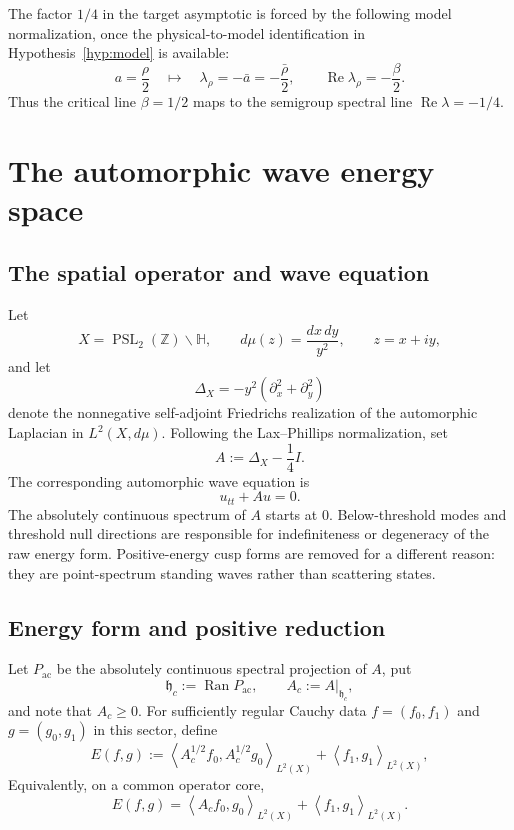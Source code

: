\documentclass[11pt]{amsart}
\theoremstyle{definition}
\theoremstyle{remark}
\DeclareMathOperator{\Ran}{Ran}
\DeclareMathOperator{\Repart}{Re}
\newcommand{\Hh}{\mathbb H}
\newcommand{\ip}[2]{\left\langle #1,#2\right\rangle}
\begin{document}
The factor $1/4$ in the target asymptotic is forced by the following
model normalization, once the physical-to-model identification in
Hypothesis~\ref{hyp:model} is available:
\[
 a=\frac{\rho}{2}
 \quad\longmapsto\quad
 \lambda_{\rho}=-\bar a=-\frac{\bar\rho}{2},
 \qquad
 \Repart\lambda_{\rho}=-\frac{\beta}{2}.
\]
Thus the critical line $\beta=1/2$ maps to the semigroup spectral line
$\Repart\lambda=-1/4$.

\section{The automorphic wave energy space}\label{sec:energy}

\subsection{The spatial operator and wave equation}

Let
\[
 X=\operatorname{PSL}_{2}(\mathbb Z)\backslash\Hh,
 \qquad
 d\mu(z)=\frac{dx\,dy}{y^{2}},\qquad z=x+iy,
\]
and let
\[
 \Delta_X=-y^{2}(\partial_x^{2}+\partial_y^{2})
\]
denote the nonnegative self-adjoint Friedrichs realization of the automorphic
Laplacian in $L^{2}(X,d\mu)$.  Following the Lax--Phillips normalization, set
\[
 A:=\Delta_X-\frac14I.
\]
The corresponding automorphic wave equation is
\begin{equation}\label{eq:wave}
 u_{tt}+Au=0.
\end{equation}
The absolutely continuous spectrum of $A$ starts at $0$.  Below-threshold
modes and threshold null directions are responsible for indefiniteness or
degeneracy of the raw energy form.  Positive-energy cusp forms are removed for
a different reason: they are point-spectrum standing waves rather than
scattering states.

\subsection{Energy form and positive reduction}

Let $P_{\mathrm{ac}}$ be the absolutely continuous spectral projection of
$A$, put
\[
 \mathfrak h_{c}:=\Ran P_{\mathrm{ac}},
 \qquad
 A_{c}:=A\big|_{\mathfrak h_{c}},
\]
and note that $A_{c}\geq0$.  For sufficiently regular Cauchy data
$f=(f_{0},f_{1})$ and $g=(g_{0},g_{1})$ in this sector, define
\begin{equation}\label{eq:energy-form}
 E(f,g)
 :=\ip{A_c^{1/2}f_{0}}{A_c^{1/2}g_{0}}_{L^{2}(X)}
   +\ip{f_{1}}{g_{1}}_{L^{2}(X)},
\end{equation}
Equivalently, on a common operator core,
\[
 E(f,g)=\ip{A_cf_{0}}{g_{0}}_{L^{2}(X)}
       +\ip{f_{1}}{g_{1}}_{L^{2}(X)}.
\]
\end{document}
